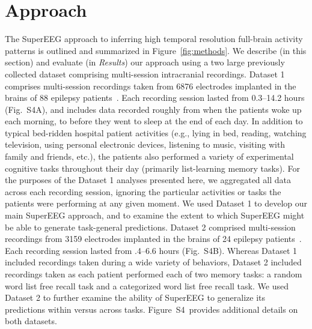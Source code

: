 \message{ !name(main.tex)}\documentclass[11pt]{article}
\newcommand{\suppstats}{S4}
\begin{document}
\section*{Approach}
The SuperEEG approach to inferring high temporal resolution full-brain
activity patterns is outlined and summarized in
Figure~\ref{fig:methods}. We describe (in this section) and evaluate
(in \textit{Results}) our approach using a two large previously
collected dataset comprising multi-session intracranial recordings.
Dataset 1 comprises multi-session recordings taken from 6876
electrodes implanted in the brains of 88 epilepsy
patients~\cite{SedeEtal03, SedeEtal07a, SedeEtal07b, MannEtal11,
  MannEtal12}.  Each recording session lasted from 0.3--14.2 hours
(Fig.~\suppstats A), and includes data recorded roughly from when the
patients woke up each morning, to before they went to sleep at the end
of each day.  In addition to typical bed-ridden hospital patient
activities (e.g., lying in bed, reading, watching television, using
personal electronic devices, listening to music, visiting with family
and friends, etc.), the patients also performed a variety of
experimental cognitive tasks throughout their day (primarily
list-learning memory tasks).  For the purposes of the Dataset 1
analyses presented here, we aggregated all data across each recording
session, ignoring the particular activities or tasks the patients were
performing at any given moment.  We used Dataset 1 to develop our main
SuperEEG approach, and to examine the extent to which SuperEEG might
be able to generate task-general predictions.  Dataset 2 comprised
multi-session recordings from 3159 electrodes implanted in the brains
of 24 epilepsy patients~\citep{EzzyEtal17, HoraEtal17, KragEtal17,
  KuceEtal17, LinEtal17, SoloEtal18, WeidEtal18, EzzyEtal18,
  KuceEtal18}.  Each recording session lasted from .4--6.6 hours
(Fig.~\suppstats B).  Whereas Dataset 1 included recordings taken during a
wide variety of behaviors, Dataset 2 included recordings taken as each
patient performed each of two memory tasks: a random word list free
recall task and a categorized word list free recall task.  We used
Dataset 2 to further examine the ability of SuperEEG to generalize its
predictions within versus across tasks.  Figure~\suppstats~provides
additional details on both datasets.
\end{document}
